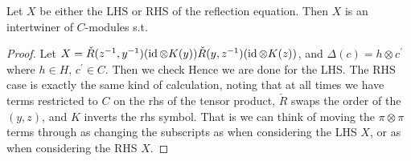 \documentclass{article}
\begin{document}
\begin{theorem}
Let $X$ be either the LHS or RHS of the reflection equation. Then $X$ is an intertwiner of $C$-modules s.t. 
\end{theorem}
\begin{proof}
Let $X = \check{R}(z^{-1},y^{-1})(\operatorname{id} \otimes K(y)) \check{R}(y,z^{-1})(\operatorname{id} \otimes K(z))$, and $\Delta(c) = h \otimes c^\prime$ where $h \in H, \, c^\prime \in C$. Then we check 
Hence we are done for the LHS. The RHS case is exactly the same kind of calculation, noting that at all times we have terms restricted to $C$ on the rhs of the tensor product, $\check{R}$ swaps the order of the $(y,z)$, and $K$ inverts the rhs symbol. That is we can think of moving the $\pi \otimes \pi$ terms through as changing the subscripts as 
when considering the LHS $X$, or as 
when considering the RHS $X$. 
\end{proof}
\end{document}
